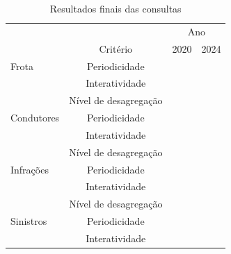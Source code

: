 \documentclass[
  a4paper,
]{article}
\begin{document}
\begin{longtable}{l|ccc}

\caption{\label{tbl-final}Resultados finais das consultas}

\tabularnewline

\toprule
\multicolumn{1}{l}{} &  & \multicolumn{2}{c}{Ano} \\ 
\cmidrule(lr){3-4}
\multicolumn{1}{l}{} & Critério & 2020 & 2024 \\ 
\midrule\addlinespace[2.5pt]
Frota & Periodicidade & \cellcolor[HTML]{F5951E}{\textcolor[HTML]{000000}{$6,7$}} & \cellcolor[HTML]{D7191C}{\textcolor[HTML]{FFFFFF}{$0,0$}} \\ 
 & Interatividade & \cellcolor[HTML]{F05E22}{\textcolor[HTML]{FFFFFF}{$3,3$}} & \cellcolor[HTML]{D7191C}{\textcolor[HTML]{FFFFFF}{$0,0$}} \\ 
 & Nível de desagregação & \cellcolor[HTML]{F5951E}{\textcolor[HTML]{000000}{$6,7$}} & \cellcolor[HTML]{D7191C}{\textcolor[HTML]{FFFFFF}{$0,0$}} \\ 
\midrule\addlinespace[2.5pt]
Condutores & Periodicidade & \cellcolor[HTML]{D7191C}{\textcolor[HTML]{FFFFFF}{$0,0$}} & \cellcolor[HTML]{D7191C}{\textcolor[HTML]{FFFFFF}{$0,0$}} \\ 
 & Interatividade & \cellcolor[HTML]{D7191C}{\textcolor[HTML]{FFFFFF}{$0,0$}} & \cellcolor[HTML]{D7191C}{\textcolor[HTML]{FFFFFF}{$0,0$}} \\ 
 & Nível de desagregação & \cellcolor[HTML]{D7191C}{\textcolor[HTML]{FFFFFF}{$0,0$}} & \cellcolor[HTML]{D7191C}{\textcolor[HTML]{FFFFFF}{$0,0$}} \\ 
\midrule\addlinespace[2.5pt]
Infrações & Periodicidade & \cellcolor[HTML]{D7191C}{\textcolor[HTML]{FFFFFF}{$0,0$}} & \cellcolor[HTML]{D7191C}{\textcolor[HTML]{FFFFFF}{$0,0$}} \\ 
 & Interatividade & \cellcolor[HTML]{D7191C}{\textcolor[HTML]{FFFFFF}{$0,0$}} & \cellcolor[HTML]{D7191C}{\textcolor[HTML]{FFFFFF}{$0,0$}} \\ 
 & Nível de desagregação & \cellcolor[HTML]{D7191C}{\textcolor[HTML]{FFFFFF}{$0,0$}} & \cellcolor[HTML]{D7191C}{\textcolor[HTML]{FFFFFF}{$0,0$}} \\ 
\midrule\addlinespace[2.5pt]
Sinistros & Periodicidade & \cellcolor[HTML]{D7191C}{\textcolor[HTML]{FFFFFF}{$0,0$}} & \cellcolor[HTML]{D7191C}{\textcolor[HTML]{FFFFFF}{$0,0$}} \\ 
 & Interatividade & \cellcolor[HTML]{D7191C}{\textcolor[HTML]{FFFFFF}{$0,0$}} & \cellcolor[HTML]{D7191C}{\textcolor[HTML]{FFFFFF}{$0,0$}} \\ 

\end{longtable}
\end{document}
